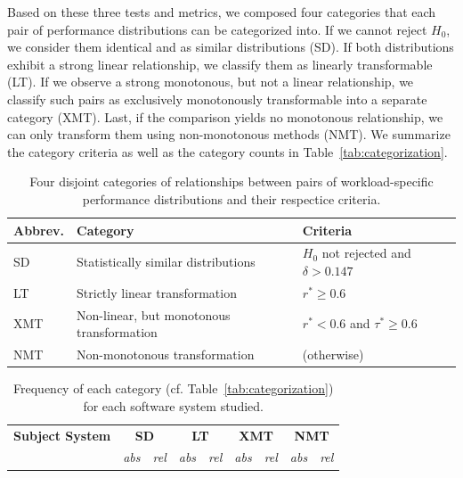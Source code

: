 {\color{black} Based on these three tests and metrics, we composed four categories that each pair of performance distributions can be categorized into. If we cannot reject $H_0$, we consider them identical and as similar distributions (\textsf{\colorbox{cs-color}{SD}}). If both distributions exhibit a strong linear relationship, we classify them as linearly transformable (\textsf{\colorbox{lt-color}{LT}}). If we observe a strong monotonous, but not a linear relationship, we classify such pairs as exclusively monotonously transformable into a separate category (\textsf{\colorbox{xmt-color}{XMT}}). Last, if the comparison yields no monotonous relationship, we can only transform them using non-monotonous methods (\textsf{\colorbox{nmt-color}{NMT}}). We summarize the category criteria as well as the category counts in Table~\ref{tab:categorization}. 

\begin{table}
	\footnotesize
	\caption{Four disjoint categories of relationships between pairs of workload-specific performance distributions and their respectice criteria.}
	\centering
\begin{tabular*}{\linewidth}{lp{3.8cm}p{3cm}}	
	\toprule
	 \textbf{Abbrev.} & \textbf{Category} & \textbf{Criteria}\\
	 \midrule
	 \cellcolor{cs-color}\textsf{SD} & {Statistically similar distributions} & {$H_0$ not rejected} and $\delta > 0.147$ \\
	 \cellcolor{lt-color}\textsf{LT} & {Strictly linear transformation} & $r^* \geq 0.6$ \\
	\cellcolor{xmt-color}\textsf{XMT} & {Non-linear, but monotonous transformation} & $r^* < 0.6 $ and $ \tau^* \geq 0.6$ \\
	\cellcolor{nmt-color}\textsf{NMT} & {Non-monotonous transformation}  & (otherwise) \\%
	\bottomrule
\end{tabular*}
\label{tab:categorization_counts}
\end{table}

\begin{table}
	\footnotesize
	\caption{Frequency of each category (cf. Table~\ref{tab:categorization}) for each software system studied.}
\begin{tabular}{lrrrrrrrr}	
	\toprule
	\textbf{Subject System} & \multicolumn{2}{c}{\textbf{\cellcolor{cs-color}\textsf{SD}}} & \multicolumn{2}{c}{\textbf{\cellcolor{lt-color}\textsf{LT}}} & \multicolumn{2}{c}{\textbf{\cellcolor{xmt-color}\textsf{XMT}}} & \multicolumn{2}{c}{\textbf{\cellcolor{nmt-color}\textsf{NMT}}}\\
	 & \textit{abs} & \textit{rel} & \textit{abs} &\textit{rel} & \textit{abs} & \textit{rel}& \textit{abs} & \textit{rel}\\
	\midrule
	

\end{tabular}
\end{table}}
